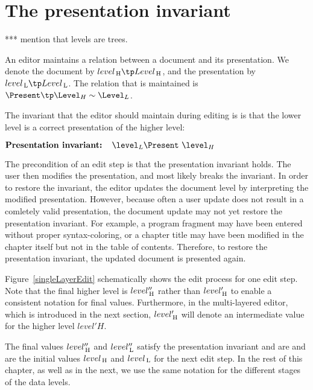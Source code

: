 %																
%																
%																
\section{The presentation invariant}
*** mention that levels are trees.

An editor maintains a relation between a document and its presentation. We denote the document by $level\H \tp Level\H$, and the presentation by $level\L \tp Level\L$. The relation that is maintained is $\Present \tp  \Level_{H} \rel \Level_{L}$. 

The invariant that the editor should maintain during editing is is that the lower level is a correct presentation of the higher level:

\begin{math}
\text{\bf Presentation invariant:~~~} \level_{L} \Present~\level_{H}\\
\end{math}

The precondition of an edit step is that the presentation invariant holds. The user then modifies the presentation, and most likely breaks the invariant. In order to restore the invariant, the editor updates the document level by interpreting the modified presentation. However, because often a user update does not result in a comletely valid presentation, the document update may not yet restore the presentation invariant. For example, a program fragment may have been entered without proper syntax-coloring, or a chapter title may have been modified in the chapter itself but not in the table of contents. Therefore, to restore the presentation invariant, the updated document is presented again.

Figure~\ref{singleLayerEdit} schematically shows the edit process for one edit step.  Note that the final higher level is $level''_{\, \mathrm H}$ rather than $level'_{\, \mathrm H}$ to enable a consistent notation for final values. Furthermore, in the multi-layered editor, which is introduced in the next section, $level'_{\, \mathrm H}$ will denote an intermediate value for the higher level $level'H$.

The final values $level''_{\, \mathrm H}$ and $level''_{\, \mathrm L}$ satisfy the presentation invariant and are and are the initial values $level_{\, \mathrm H}$ and $level_{\, \mathrm L}$ for the next edit step. In the rest of this chapter, as well as in the next, we use the same notation for the different stages of the data levels.


